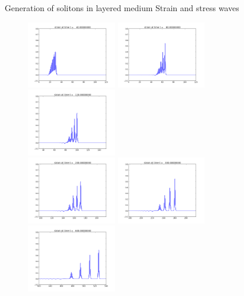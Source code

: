 \documentclass{beamer}
\begin{document}
\begin{frame}{Generation of solitons in layered medium}
Strain and stress waves
\begin{figure}
  \includegraphics[width=0.35\textwidth]{frame0004fig1.png}
  \includegraphics[width=0.35\textwidth]{frame0008fig1.png}
  \includegraphics[width=0.35\textwidth]{frame0012fig1.png}\\
  \includegraphics[width=0.35\textwidth]{frame0020fig1.png}
  \includegraphics[width=0.35\textwidth]{frame0030fig1.png}
  \includegraphics[width=0.35\textwidth]{frame0060fig1.png}
\end{figure}
\end{frame}
\end{document}
